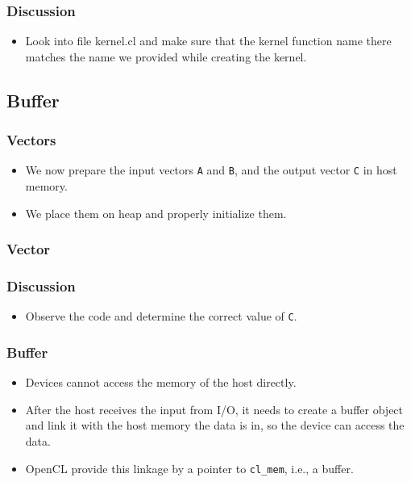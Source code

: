 \documentclass{beamer}
\begin{document}
\begin{frame}
  \frametitle{Discussion}
  \begin{itemize}
  \item Look into file kernel.cl and make sure that the kernel
    function name there matches the name we provided while creating
    the kernel.
  \end{itemize}
\end{frame}

\subsection{Buffer}

\begin{frame}
  \frametitle{Vectors}
  \begin{itemize}
  \item We now prepare the input vectors {\tt A} and {\tt B}, and
    the output vector {\tt C} in host memory.
  \item We place them on heap and properly initialize them.
  \end{itemize}
\end{frame}

\begin{frame}
  \frametitle{Vector}
\end{frame}

\begin{frame}
  \frametitle{Discussion}
  \begin{itemize}
    \item Observe the code and determine the correct value of {\tt C}.
  \end{itemize}
\end{frame}

\begin{frame}
  \frametitle{Buffer}
  \begin{itemize}
  \item Devices cannot access the memory of the host directly.
  \item After the host receives the input from I/O, it needs to
    create a buffer object and link it with the host memory the data
    is in, so the device can access the data.  
  \item OpenCL provide this linkage by a pointer to {\tt cl\_mem},
    i.e., a buffer.
  \end{itemize}
\end{frame}
\end{document}
